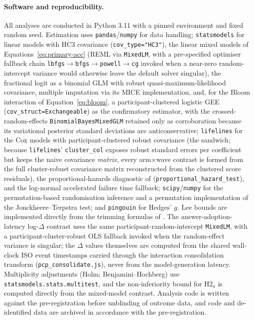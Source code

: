\paragraph{Software and reproducibility.}
All analyses are conducted in Python 3.11 with a pinned environment and fixed random seed. Estimation uses \texttt{pandas}/\texttt{numpy} for data handling; \texttt{statsmodels} for linear models with HC3 covariance (\texttt{cov\_type="HC3"}), the linear mixed models of Equations~\eqref{eq:primary-acc} (REML via \texttt{MixedLM}, with a pre-specified optimiser fallback chain \texttt{lbfgs}$\to$\texttt{bfgs}$\to$\texttt{powell}$\to$\texttt{cg} invoked when a near-zero random-intercept variance would otherwise leave the default solver singular), the fractional logit as a binomial GLM with robust quasi-maximum-likelihood covariance, multiple imputation via its MICE implementation, and, for the Bloom interaction of Equation~\eqref{eq:bloom}, a participant-clustered logistic GEE (\texttt{cov\_struct=Exchangeable}) as the confirmatory estimator, with the crossed-random-effects \texttt{BinomialBayesMixedGLM} retained only as corroboration because its variational posterior standard deviations are anticonservative; \texttt{lifelines} for the Cox models with participant-clustered robust covariance (the \textcite{lin1989} sandwich; because \texttt{lifelines}' \texttt{cluster\_col} exposes robust standard errors per coefficient but keeps the naive covariance \emph{matrix}, every arm$\times$wave contrast is formed from the full cluster-robust covariance matrix reconstructed from the clustered score residuals), %
the proportional-hazards diagnostic of \textcite{grambsch1994} %
(\texttt{proportional\_hazard\_test}), and the log-normal accelerated failure time fallback; \texttt{scipy}/\texttt{numpy} for the permutation-based randomisation inference and a permutation implementation of the Jonckheere--Terpstra test; and \texttt{pingouin} for Hedges' $g$. Lee bounds are implemented directly from the trimming formulas of \textcite{lee2009}. %
The answer-adoption-latency log-$\Delta$ contrast uses the same participant-random-intercept \texttt{MixedLM}, with a participant-cluster-robust OLS fallback invoked when the random-effect variance is singular; the $\Delta$ values themselves are computed from the shared wall-clock ISO event timestamps carried through the interaction consolidation transform (\texttt{pcp\_consolidate.js}), never from the model-generation latency.
Multiplicity adjustments (Holm; Benjamini--Hochberg) use \texttt{statsmodels.stats.multitest}, and the non-inferiority bound for H2$_a$ is computed directly from the mixed-model contrast.
Analysis code is written against the pre-registration before unblinding of outcome data, and code and de-identified data are archived in accordance with the pre-registration.
